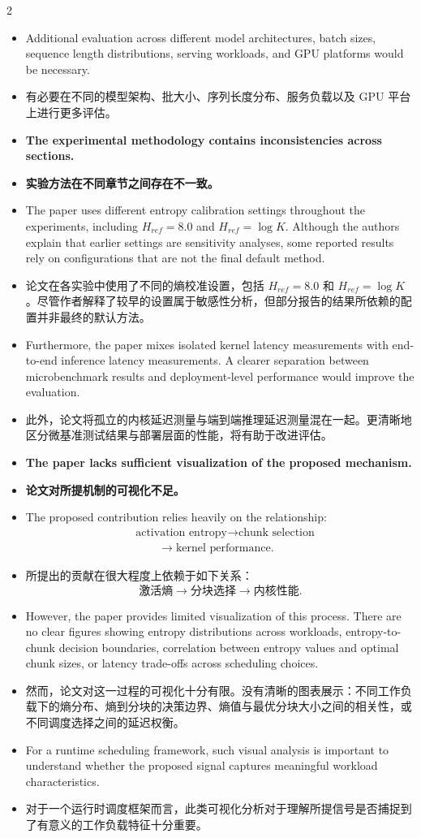 \documentclass[10pt,a4paper]{article}
\newcommand{\Pair}[2]{#1\par\switchcolumn #2\par\switchcolumn*}
\newcommand{\PItem}[3]{\Pair{\begin{itemize}[label={#1}]\item #2\end{itemize}}%
                            {\begin{itemize}[label={#1}]\item #3\end{itemize}}}
\newcommand{\PCont}[2]{\Pair{\begin{itemize}[label={}]\item #1\end{itemize}}%
                            {\begin{itemize}[label={}]\item #2\end{itemize}}}
\begin{document}
\begin{paracol}{2}
\PCont{Additional evaluation across different model architectures, batch sizes,
sequence length distributions, serving workloads, and GPU platforms would be
necessary.}
{有必要在不同的模型架构、批大小、序列长度分布、服务负载以及 GPU 平台上进行更多评估。}

\PItem{5.}{\textbf{The experimental methodology contains inconsistencies across
sections.}}
{\textbf{实验方法在不同章节之间存在不一致。}}

\PCont{The paper uses different entropy calibration settings throughout the
experiments, including $H_{ref}=8.0$ and $H_{ref}=\log K$. Although the authors
explain that earlier settings are sensitivity analyses, some reported results rely
on configurations that are not the final default method.}
{论文在各实验中使用了不同的熵校准设置，包括 $H_{ref}=8.0$ 和 $H_{ref}=\log K$。尽管作者解释了较早的设置属于敏感性分析，但部分报告的结果所依赖的配置并非最终的默认方法。}

\PCont{Furthermore, the paper mixes isolated kernel latency measurements with
end-to-end inference latency measurements. A clearer separation between
microbenchmark results and deployment-level performance would improve the
evaluation.}
{此外，论文将孤立的内核延迟测量与端到端推理延迟测量混在一起。更清晰地区分微基准测试结果与部署层面的性能，将有助于改进评估。}

\PItem{6.}{\textbf{The paper lacks sufficient visualization of the proposed
mechanism.}}
{\textbf{论文对所提机制的可视化不足。}}

\PCont{The proposed contribution relies heavily on the relationship:
\[
\begin{aligned}
&\text{activation entropy}\rightarrow\text{chunk selection}\\
&\qquad\rightarrow\text{kernel performance}.
\end{aligned}
\]}
{所提出的贡献在很大程度上依赖于如下关系：
\[
\text{激活熵}\rightarrow\text{分块选择}\rightarrow\text{内核性能}.
\]}

\PCont{However, the paper provides limited visualization of this process. There are
no clear figures showing entropy distributions across workloads, entropy-to-chunk
decision boundaries, correlation between entropy values and optimal chunk sizes, or
latency trade-offs across scheduling choices.}
{然而，论文对这一过程的可视化十分有限。没有清晰的图表展示：不同工作负载下的熵分布、熵到分块的决策边界、熵值与最优分块大小之间的相关性，或不同调度选择之间的延迟权衡。}

\PCont{For a runtime scheduling framework, such visual analysis is important to
understand whether the proposed signal captures meaningful workload
characteristics.}
{对于一个运行时调度框架而言，此类可视化分析对于理解所提信号是否捕捉到了有意义的工作负载特征十分重要。}


\end{paracol}
\end{document}
